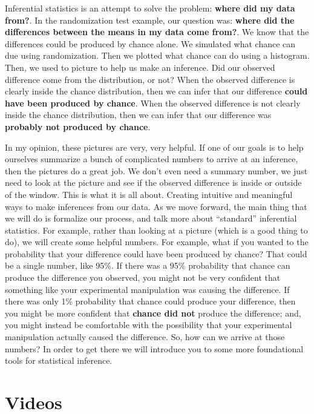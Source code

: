 \documentclass[
]{book}
\begin{document}
Inferential statistics is an attempt to solve the problem: \textbf{where did my data from?}. In the randomization test example, our question was: \textbf{where did the differences between the means in my data come from?}. We know that the differences could be produced by chance alone. We simulated what chance can due using randomization. Then we plotted what chance can do using a histogram. Then, we used to picture to help us make an inference. Did our observed difference come from the distribution, or not? When the observed difference is clearly inside the chance distribution, then we can infer that our difference \textbf{could have been produced by chance}. When the observed difference is not clearly inside the chance distribution, then we can infer that our difference was \textbf{probably not produced by chance}.

In my opinion, these pictures are very, very helpful. If one of our goals is to help ourselves summarize a bunch of complicated numbers to arrive at an inference, then the pictures do a great job. We don't even need a summary number, we just need to look at the picture and see if the observed difference is inside or outside of the window. This is what it is all about. Creating intuitive and meaningful ways to make inferences from our data. As we move forward, the main thing that we will do is formalize our process, and talk more about ``standard'' inferential statistics. For example, rather than looking at a picture (which is a good thing to do), we will create some helpful numbers. For example, what if you wanted to the probability that your difference could have been produced by chance? That could be a single number, like 95\%. If there was a 95\% probability that chance can produce the difference you observed, you might not be very confident that something like your experimental manipulation was causing the difference. If there was only 1\% probability that chance could produce your difference, then you might be more confident that \textbf{chance did not} produce the difference; and, you might instead be comfortable with the possibility that your experimental manipulation actually caused the difference. So, how can we arrive at those numbers? In order to get there we will introduce you to some more foundational tools for statistical inference.

\hypertarget{videos}{%
\section{Videos}\label{videos}}
\end{document}
